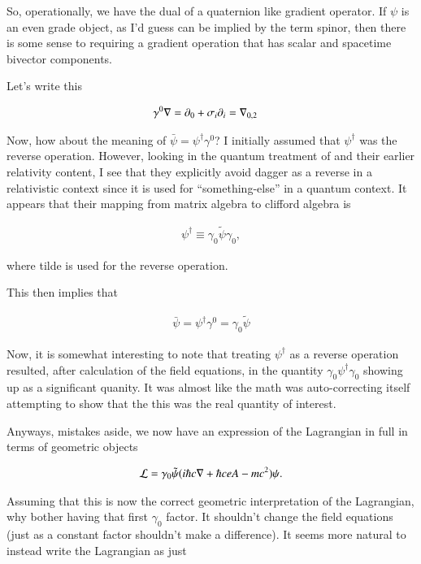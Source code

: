 \documentclass{article}
\begin{document}
So, operationally, we have the dual of a quaternion like gradient operator.  If $\psi$ is an even grade object, as I'd guess can be implied by
the term spinor, then there is some sense to requiring a gradient operation that has scalar and spacetime bivector components.

Let's write this

\begin{align*}
\gamma^0 \nabla &= \partial_0 + \sigma_i \partial_i = {\nabla}_{0,2}
\end{align*}

Now, how about the meaning of $\bar\psi = \psi^\dagger \gamma^0$?  I initially assumed that $\psi^\dagger$ was the reverse operation.
However, looking in the quantum treatment of \cite{doran2003gap} and their earlier relativity content, I see that they explicitly avoid dagger as a reverse in a relativistic context since it is used for ``something-else'' in a quantum context.  It appears that their mapping from matrix algebra to clifford 
algebra is 

\begin{align*}
\psi^\dagger \equiv \gamma_0 \tilde{\psi} \gamma_0,
\end{align*}

where tilde is used for the reverse operation.

This then implies that 

\begin{align*}
\bar \psi = \psi^\dagger \gamma^0 = \gamma_0 \tilde{\psi}
\end{align*}

Now, it is somewhat interesting to note that treating $\psi^\dagger$ as a reverse operation resulted, after calculation of the field equations, in the quantity $\gamma_0 \psi^\dagger \gamma_0$ showing up as a significant quanity.  It was almost like the math was auto-correcting itself attempting to show that the this was the real quantity of interest.

Anyways, mistakes aside, we now have an expression of the Lagrangian in full in terms of geometric objects

\begin{align}\label{eqn:lag2}
\mathcal{L} = \gamma_0 \tilde{\psi} ( i \hbar c \nabla + \hbar c e A - mc^2) \psi.
\end{align}

Assuming that this is now the correct geometric interpretation of the Lagrangian, why bother having that first $\gamma_0$ factor.  It shouldn't change the field equations (just as a constant factor shouldn't make a difference).  It seems more natural to instead write the Lagrangian as just
\end{document}

